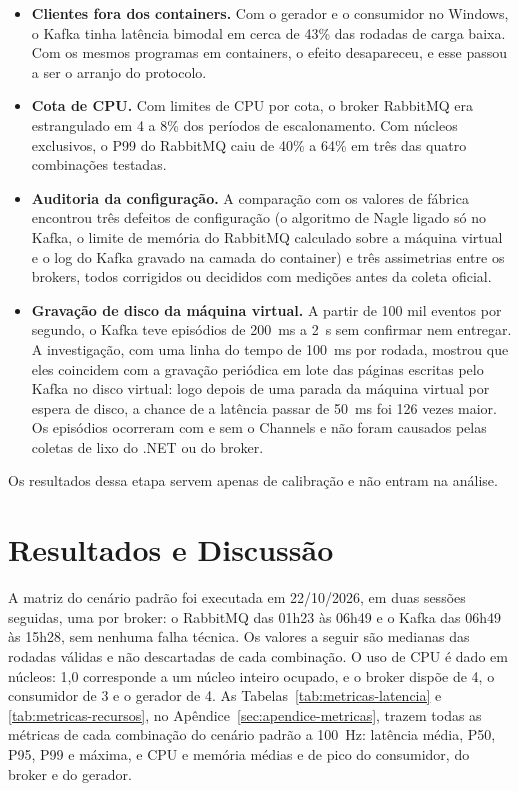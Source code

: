\documentclass[12pt]{article}
\begin{document}
\begin{itemize}
  \item \textbf{Clientes fora dos containers.} Com o gerador e o consumidor no Windows, o
        Kafka tinha latência bimodal em cerca de 43\% das rodadas de carga baixa. Com os
        mesmos programas em containers, o efeito desapareceu, e esse passou a ser o
        arranjo do protocolo.
  \item \textbf{Cota de CPU.} Com limites de CPU por cota, o broker RabbitMQ era
        estrangulado em 4 a 8\% dos períodos de escalonamento. Com núcleos exclusivos, o
        P99 do RabbitMQ caiu de 40\% a 64\% em três das quatro combinações testadas.
  \item \textbf{Auditoria da configuração.} A comparação com os valores de fábrica
        encontrou três defeitos de configuração (o algoritmo de Nagle ligado só no Kafka,
        o limite de memória do RabbitMQ calculado sobre a máquina virtual e o log do Kafka
        gravado na camada do container) e três assimetrias entre os brokers, todos
        corrigidos ou decididos com medições antes da coleta oficial.
  \item \textbf{Gravação de disco da máquina virtual.} A partir de 100 mil eventos por
        segundo, o Kafka teve episódios de 200~ms a 2~s sem confirmar nem entregar. A
        investigação, com uma linha do tempo de 100~ms por rodada, mostrou que eles
        coincidem com a gravação periódica em lote das páginas escritas pelo Kafka no
        disco virtual: logo depois de uma parada da máquina virtual por espera de disco, a
        chance de a latência passar de 50~ms foi 126 vezes maior. Os episódios ocorreram
        com e sem o Channels e não foram causados pelas coletas de lixo do .NET ou do
        broker.
\end{itemize}

Os resultados dessa etapa servem apenas de calibração e não entram na análise.


\section{Resultados e Discussão}
\label{sec:resultados}

A matriz do cenário padrão foi executada em 22/10/2026, em duas sessões
seguidas, uma por broker: o RabbitMQ das 01h23 às 06h49 e o Kafka das 06h49 às
15h28, sem nenhuma falha técnica. Os valores a seguir são medianas das rodadas
válidas e não descartadas de cada combinação. O uso de CPU é dado em núcleos:
1,0 corresponde a um núcleo inteiro ocupado, e o broker dispõe de 4, o
consumidor de 3 e o gerador de 4. As Tabelas~\ref{tab:metricas-latencia} e
\ref{tab:metricas-recursos}, no Apêndice~\ref{sec:apendice-metricas}, trazem
todas as métricas de cada combinação do cenário padrão a 100~Hz: latência
média, P50, P95, P99 e máxima, e CPU e memória médias e de pico do consumidor,
do broker e do gerador.
\end{document}
